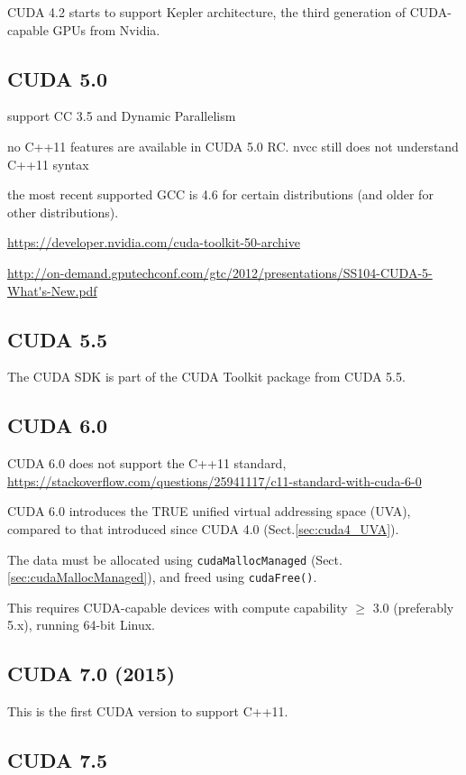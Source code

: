 CUDA 4.2 starts to support Kepler architecture, the third generation of
CUDA-capable GPUs from Nvidia. 

\subsection{CUDA 5.0}
\label{sec:CUDA_50}

support CC 3.5  and Dynamic Parallelism


no C++11 features are available in CUDA 5.0 RC. nvcc still does not understand C++11 syntax 

the most recent supported GCC is 4.6 for certain distributions (and older for other distributions).
 
\url{https://developer.nvidia.com/cuda-toolkit-50-archive}

\url{http://on-demand.gputechconf.com/gtc/2012/presentations/SS104-CUDA-5-What's-New.pdf}

\subsection{CUDA 5.5}
\label{sec:CUDA_55}

The CUDA SDK is part of the CUDA Toolkit package from CUDA 5.5.

\subsection{CUDA 6.0}
\label{sec:CUDA_60}

CUDA 6.0 does not support the C++11 standard,
\url{https://stackoverflow.com/questions/25941117/c11-standard-with-cuda-6-0}

CUDA 6.0 introduces the TRUE unified virtual addressing space (UVA), compared to
that introduced since CUDA 4.0 (Sect.\ref{sec:cuda4_UVA}).

The data must be allocated using \verb!cudaMallocManaged!
(Sect.\ref{sec:cudaMallocManaged}), and freed using \verb!cudaFree()!.

This requires CUDA-capable devices with compute capability $\ge$ 3.0 (preferably
5.x), running 64-bit Linux.


\subsection{CUDA 7.0 (2015)}
\label{sec:CUDA-7.0}

This is the first CUDA version to support C++11.


\subsection{CUDA 7.5}
\label{sec:CUDA_75}

